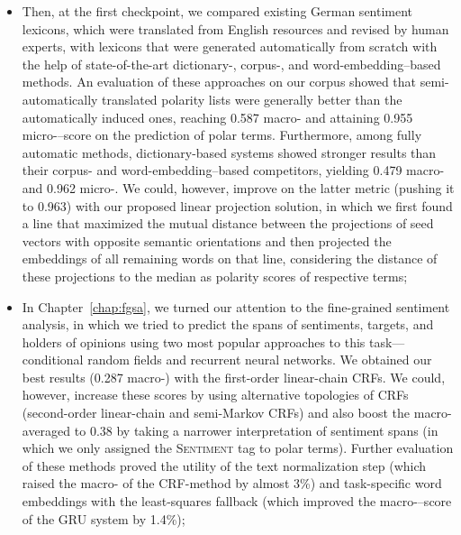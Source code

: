 \begin{itemize}
\item Then, at the first checkpoint, we compared existing German
  sentiment lexicons, which were translated from English resources and
  revised by human experts, with lexicons that were generated
  automatically from scratch with the help of state-of-the-art
  dictionary\mbox{-,} corpus\mbox{-,} and word-embedding--based
  methods.  An evaluation of these approaches on our corpus showed
  that semi-automatically translated polarity lists were generally
  better than the automatically induced ones, reaching 0.587
  macro-\F{} and attaining 0.955 micro-\F{}--score on the prediction
  of polar terms.  Furthermore, among fully automatic methods,
  dictionary-based systems showed stronger results than their corpus-
  and word-embedding--based competitors, yielding 0.479 macro-\F{} and
  0.962 micro-\F{}.  We could, however, improve on the latter metric
  (pushing it to 0.963) with our proposed linear projection solution,
  in which we first found a line that maximized the mutual distance
  between the projections of seed vectors with opposite semantic
  orientations and then projected the embeddings of all remaining
  words on that line, considering the distance of these projections to
  the median as polarity scores of respective terms;

\item In Chapter~\ref{chap:fgsa}, we turned our attention to the
  fine-grained sentiment analysis, in which we tried to predict the
  spans of sentiments, targets, and holders of opinions using two most
  popular approaches to this task---conditional random fields and
  recurrent neural networks.  We obtained our best results (0.287
  macro-\F{}) with the first-order linear-chain CRFs.  We could,
  however, increase these scores by using alternative topologies of
  CRFs (second-order linear-chain and semi-Markov CRFs) and also boost
  the macro-averaged \F{} to 0.38 by taking a narrower interpretation
  of sentiment spans (in which we only assigned the \textsc{Sentiment}
  tag to polar terms).  Further evaluation of these methods proved the
  utility of the text normalization step (which raised the macro-\F{}
  of the CRF-method by almost 3\%) and task-specific word embeddings
  with the least-squares fallback (which improved the
  macro-\F{}--score of the GRU system by 1.4\%);


\end{itemize}

